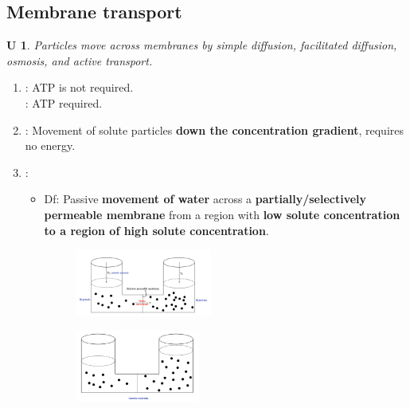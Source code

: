 \documentclass[12pt, a4paper]{article}
\newtheorem{und}{U}[subsection]
\begin{document}
\subsection{Membrane transport}
\begin{und}
    Particles move across membranes by simple diffusion, facilitated diffusion, osmosis, and active transport. 
\end{und}
\begin{enumerate}
    \item \textbf{\color{red}{Passive transport}}: ATP is not required. {\color{blue}{Diffusion, osmosis, facilitated diffusion.}}\\\textbf{\color{red}{Active transport}}: ATP required. 
    \item \textbf{\color{red}{Simple diffusion}}: Movement of solute particles \textbf{down the concentration gradient}, requires no energy. 
    \item \textbf{\color{red}{Osmosis}}: 
    \begin{itemize}
        \item Df: Passive \textbf{movement of water} across a \textbf{partially/selectively permeable membrane} from a region with \textbf{low solute concentration to a region of high solute concentration}.
        \begin{multicols}{2}
            \begin{figure}[H]
            \center
            \includegraphics[width=0.45\textwidth]{Fig1.8.png}
        \end{figure}
        \begin{figure}[H]
            \center
            \includegraphics[width=0.41\textwidth]{Fig1.9.png}
        \end{figure}
    \end{multicols}
    \begin{figure}[H]
        \center

\end{figure}
\end{itemize}
\end{enumerate}
\end{document}
